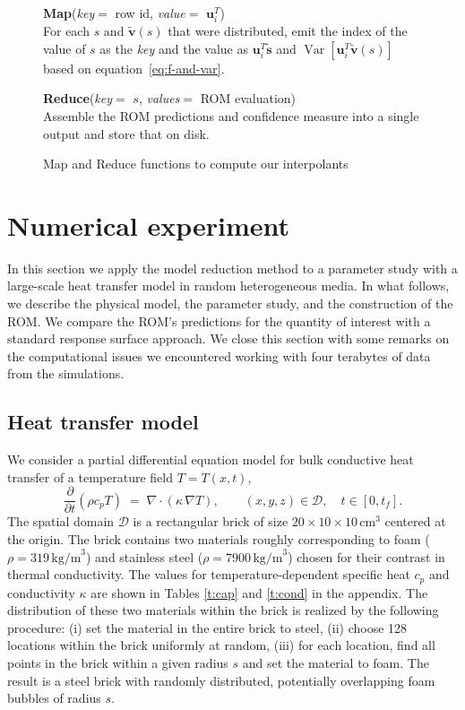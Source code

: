 \documentclass[final]{siamltex}
\providecommand{\vs}{\ensuremath{{\mathbf{{s}}}}}
\providecommand{\vu}{\ensuremath{{\mathbf{{u}}}}}
\providecommand{\vv}{\ensuremath{{\mathbf{{v}}}}}
\begin{document}
\begin{figure}
\begin{minipage}[t]{0.48\linewidth}\footnotesize\textbf{Map}(\emph{key}$=$ row id, \emph{value}$=$ $\vu_i^T$) \\ For
each $s$ and $\tilde{\vv}(s)$ that were distributed, emit the index of
the value of $s$ as the \emph{key} and the value as $\vu_i^T
\tilde{\vs}$ and ${\operatorname{Var}\left[{\vu_i^T \tilde{\vv}(s)}\right]}$ based on
equation~\eqref{eq:f-and-var}.
\end{minipage}
\hfill
\begin{minipage}[t]{0.48\linewidth}\footnotesize\textbf{Reduce}(\emph{key}$=$ $s$, \emph{values}$=$ ROM
evaluation)\\ Assemble the ROM predictions and confidence measure into
a single output and store that on disk.
\end{minipage}
\caption{Map and Reduce functions to compute our interpolants}
\end{figure}

\section{Numerical experiment}
\label{sec:exp}
In this section we apply the model reduction method to a parameter
study with a large-scale heat transfer model in random heterogeneous
media. In what follows, we describe the physical model, the parameter
study, and the construction of the ROM. We compare the ROM's
predictions for the quantity of interest with a standard response
surface approach. We close this section with some remarks on the
computational issues we encountered working with four terabytes of
data from the simulations.

\subsection{Heat transfer model}
We consider a partial differential equation model for bulk conductive
heat transfer of a temperature field $T=T(x,t)$,
\begin{equation}
\frac{\partial}{\partial t} (\rho c_p T) \;=\; \nabla\cdot(\kappa \,\nabla T), 
\qquad (x,y,z)\in\mathcal{D},\quad t\in [0,t_f].
\end{equation}
The spatial domain $\mathcal{D}$ is a rectangular brick of size
$20\times 10\times 10\,\mathrm{cm}^3$ centered at the origin.
The brick contains two materials roughly corresponding to foam
($\rho=319\,\mathrm{kg/m}^{3}$) and stainless steel
($\rho=7900\,\mathrm{kg/m}^3$) chosen for their contrast in thermal
conductivity. The values for temperature-dependent specific heat $c_p$
and conductivity $\kappa$ are shown in Tables \ref{t:cap} and
\ref{t:cond} in the appendix. The distribution of these two materials
within the brick is realized by the following procedure: (i) set the
material in the entire brick to steel, (ii) choose 128 locations
within the brick uniformly at random, (iii) for each location, find
all points in the brick within a given radius $s$ and set the material
to foam. The result is a steel brick with randomly distributed,
potentially overlapping foam bubbles of radius $s$.
\end{document}
